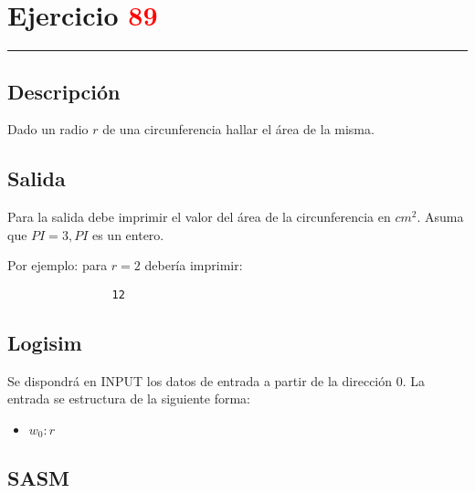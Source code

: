 \documentclass[a4paper]{article}
\begin{document}
\begin{flushleft}
\begin{figure}[ht]
\begin{tikzpicture}
      		 	\end{tikzpicture}
      		 \end{figure}
      		 \newpage
      		 
      		\section*{Ejercicio \textcolor{red}{89}}
      				 \rule{\linewidth}{2pt}	
      	    \subsection*{Descripción}
      	    
      	    Dado un radio $r$ de una circunferencia hallar el área de la misma.
      	     
      	     \subsection*{Salida}
      	     
      	     Para la salida debe imprimir el valor del área de la circunferencia en $cm^2$. Asuma que $PI = 3, PI$ es un entero.\newline
      	     
      	     Por ejemplo: para $r = 2$ debería imprimir:
      	     
      	     \begin{lstlisting}
      	     	12
      	     \end{lstlisting}
      	     
      	     	\subsection*{Logisim}
      	     
      	     Se dispondrá en INPUT los datos de entrada a partir de la dirección 0. La entrada se estructura de la siguiente forma:
      	     
      	     \begin{itemize}
      	     	
      	     	\item $w_{0}: r$
      	     \end{itemize}
      	     
      	     \subsection*{SASM}
      	     

\end{flushleft}
\end{document}
